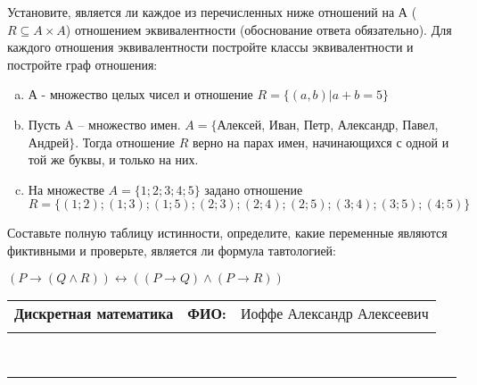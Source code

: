 \documentclass[10pt]{exam}
\newcommand{\class}{Дискретная математика}
\newcommand{\examdate}{}
\begin{document}
\begin{questions}
\question
Установите, является ли каждое из перечисленных ниже отношений на А ($R \subseteq A \times A$) отношением эквивалентности (обоснование ответа обязательно). Для каждого отношения эквивалентности постройте классы 
эквивалентности и постройте граф отношения:
\begin{enumerate} [a)]\setcounter{enumi}{0}
\item А - множество целых чисел и отношение $R = \{(a,b)|a + b = 5\}$
\item Пусть A – множество имен. $A = \{ $Алексей, Иван, Петр, Александр, Павел, Андрей$ \}$. Тогда отношение $R $ верно на парах имен, начинающихся с одной и той же буквы, и только на них.
\item На множестве $A = \{1; 2; 3; 4; 5\}$ задано отношение $R = \{(1; 2); (1; 3); (1; 5); (2; 3); (2; 4); (2; 5); (3; 4); (3; 5); (4; 5)\}$
\end{enumerate}\question Составьте полную таблицу истинности, определите, какие переменные являются фиктивными и проверьте, является ли формула тавтологией:

$(P \rightarrow (Q \land R)) \leftrightarrow ((P \rightarrow Q) \land (P \rightarrow R))$

\end{questions}
\newpage
\begin{flushright}
\begin{tabular}{p{2.8in} r l}
\textbf{\class} & \textbf{ФИО:} &Иоффе Александр Алексеевич
\\

\textbf{\examdate} &&\\
\end{tabular}\\
\end{flushright}
\rule[1ex]{\textwidth}{.1pt}
\end{document}
